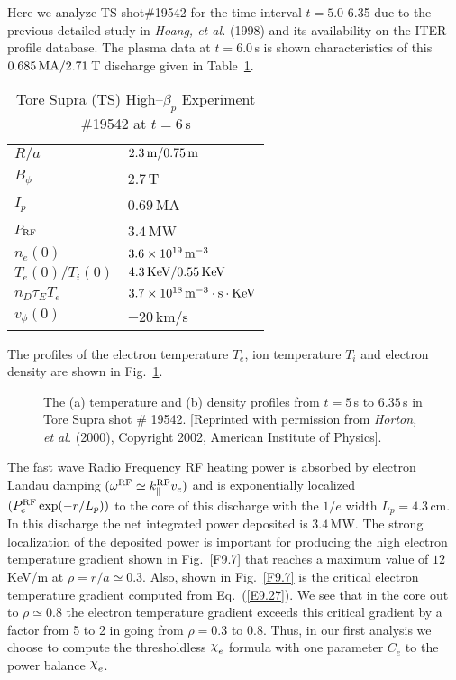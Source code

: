 \documentclass[a4paper,openany,12pt]{book}
\def\chix{\raise.5ex\hbox{$\chi$}}
\begin{document}
Here we analyze TS shot\#19542 for the time interval $t=5.0$-6.35 due to the previous detailed study in \emph{Hoang, et al.} (1998) and its availability on the ITER profile database. The plasma data at $t=6.0\,$s is shown characteristics of this 
$0.685\,\rm MA/2.71\,$T discharge given in Table~\ref{T9.3}. 
%
\begin{table}[H]
\begin{center}
\caption{Tore Supra (TS) High--$\beta_p$ Experiment \#19542 at $t=6\,$s}
\begin{tabular}{ll}\\\hline\hline
$R/a$   &$2.3\,\rm m/0.75\,\rm m$\\
$B_\phi$   &$2.7\,$T\\
$I_p$    &$0.69\,$MA\\
$P_{\rm RF}$   &$3.4\,$MW\\
$n_e(0)$   &$3.6\times 10^{19}\,\rm m^{-3}$\\
$T_e(0)/T_i(0)$    &$4.3\,\rm KeV/0.55\,\rm KeV$\\
$n_D\tau_E T_e$    &$3.7\times 10^{18}\,\rm m^{-3}\cdot s\cdot\mbox{KeV}$\\
$v_\phi(0)$    &$-20\,$km/s\\\hline\hline
\end{tabular}
\label{T9.3}
\end{center}
\end{table}
%
The profiles of the electron temperature $T_e$, ion temperature $T_i$ and electron density are shown in Fig.~\ref{F9.6}.
%
\begin{figure}[H]
\centerline{}
\caption{The (a) temperature and (b) density profiles from $t=5\,$s to $6.35\,$s in Tore Supra shot \# 19542. [Reprinted with permission from \emph{Horton, et al.} (2000), Copyright 2002, American Institute of Physics].}
\label{F9.6}
\end{figure}
%

The fast wave Radio Frequency RF heating power is absorbed by electron Landau damping $(\omega^{\rm RF}\simeq k_\|^{\rm RF}v_e)$ and is exponentially localized $(P_e^{\rm RF}\exp(-r/L_p))$ to the core of this discharge with the $1/e$ width $L_p=4.3\,$cm. In this discharge the net integrated power deposited is $3.4\,$MW. The strong localization of the deposited power is important for producing the high electron temperature gradient shown in Fig.~\ref{F9.7} that reaches a maximum value of $12\, $KeV/m at $\rho=r/a\simeq 0.3$. Also, shown in Fig.~\ref{F9.7} is the critical electron temperature gradient computed from Eq.~(\ref{E9.27}). We see that in the core out to $\rho\simeq 0.8$ the electron temperature gradient exceeds this critical gradient by a factor from 5 to 2 in going from $\rho=0.3$ to 0.8. Thus, in our first analysis we choose to compute the thresholdless  $\chix_e$ formula with one parameter $C_e$ to the power balance $\chix_e$.
\end{document}
